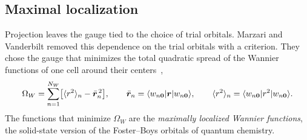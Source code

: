\subsection{Maximal localization}

Projection leaves the gauge tied to the choice of trial orbitals. Marzari and Vanderbilt removed this dependence on the trial orbitals with a criterion. They chose the gauge that minimizes the total quadratic spread of the Wannier functions of one cell around their centers~\cite[Eq.~(11)]{marzari1997maximally},
\begin{equation}
  \Omega_W = \sum_{n=1}^{N_W}\bigl[\langle r^2\rangle_n - \bar{\bm{r}}_n^{\,2}\bigr], \qquad
  \bar{\bm{r}}_n = \langle w_{n\bm{0}}|\bm{r}|w_{n\bm{0}}\rangle, \qquad
  \langle r^2\rangle_n = \langle w_{n\bm{0}}|r^2|w_{n\bm{0}}\rangle .
  \label{eq:3.6-spread}
\end{equation}
The functions that minimize $\Omega_W$ are the \emph{maximally localized Wannier functions}, the solid-state version of the Foster--Boys orbitals of quantum chemistry.

